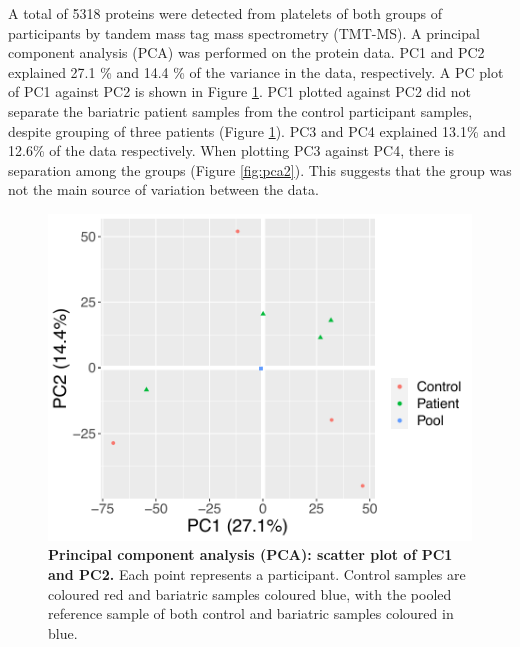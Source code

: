 \documentclass[11pt,twoside]{bristolthesis}
\begin{document}
A total of 5318 proteins were detected from platelets of both groups of participants by tandem mass tag mass spectrometry (TMT-MS). A principal component analysis (PCA) was performed on the protein data. PC1 and PC2 explained 27.1 \% and 14.4 \% of the variance in the data, respectively. A PC plot of PC1 against PC2 is shown in Figure \ref{fig:pca}. PC1 plotted against PC2 did not separate the bariatric patient samples from the control participant samples, despite grouping of three patients (Figure \ref{fig:pca}). PC3 and PC4 explained 13.1\% and 12.6\% of the data respectively. When plotting PC3 against PC4, there is separation among the groups (Figure \ref{fig:pca2}). This suggests that the group was not the main source of variation between the data.



\begin{figure}

{\centering \includegraphics[width=0.8\linewidth]{figure/Bariatric_study/Proteomic_PCA} 

}

\caption[Principal component analysis (PCA): scatter plot of PC1 and PC2]{\textbf{Principal component analysis (PCA): scatter plot of PC1 and PC2.} Each point represents a participant. Control samples are coloured red and bariatric samples coloured blue, with the pooled reference sample of both control and bariatric samples coloured in blue.}\label{fig:pca}
\end{figure}
\end{document}
